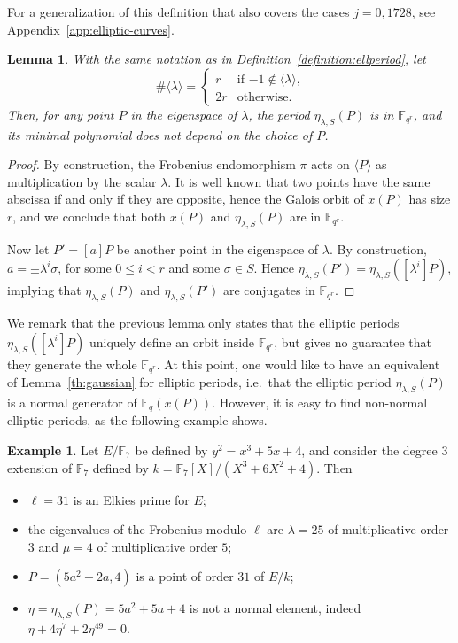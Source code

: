 \documentclass[12pt]{article}
\theoremstyle{plain}
\newtheorem{lemma}[theorem]{Lemma}
\theoremstyle{definition}
\newtheorem{example}[theorem]{Example}
\def\F{\ensuremath{\mathbb{F}}}
\begin{document}
For a generalization of this definition that also covers the cases
$j=0,1728$, see Appendix~\ref{app:elliptic-curves}.

\begin{lemma}
  \label{lemma:ellperiods-order}
  With the same notation as in Definition~\ref{definition:ellperiod},
  let
  \begin{equation*}
    \#\langle\lambda\rangle =
    \begin{cases}
      r & \text{if $-1\notin\langle\lambda\rangle$,}\\
      2r & \text{otherwise.}
    \end{cases}
  \end{equation*}
  Then, for any point $P$ in the eigenspace of $\lambda$, the period
  $\eta_{\lambda,S}(P)$ is in $\F_{q^r}$, and its minimal polynomial
  does not depend on the choice of $P$.
\end{lemma}
\begin{proof}
  By construction, the Frobenius endomorphism $\pi$ acts on
  $\langle P\rangle$ as multiplication by the scalar $\lambda$. It is
  well known that two points have the same abscissa if and only if
  they are opposite, hence the Galois orbit of $x(P)$ has size $r$,
  and we conclude that both $x(P)$ and $\eta_{\lambda,S}(P)$ are in
  $\F_{q^r}$.

  Now let $P'=[a]P$ be another point in the eigenspace of
  $\lambda$. By construction, $a=\pm \lambda^i\sigma$, for some
  $0\le i<r$ and some $\sigma\in S$. Hence
  $\eta_{\lambda,S}(P')=\eta_{\lambda,S}([\lambda^i]P)$, implying that
  $\eta_{\lambda,S}(P)$ and $\eta_{\lambda,S}(P')$ are conjugates in
  $\F_{q^r}$.
\end{proof}

We remark that the previous lemma only states that the elliptic
periods $\eta_{\lambda,S}([\lambda^i]P)$ uniquely define an orbit
inside $\F_{q^r}$, but gives no guarantee that they generate the whole
$\F_{q^r}$. %
At this point, one would like to have an equivalent of
Lemma~\ref{th:gaussian} for elliptic periods, i.e.\ that the elliptic
period $\eta_{\lambda,S}(P)$ is a normal generator of $\F_q(x(P))$.
However, it is easy to find non-normal elliptic periods, as the
following example shows.

\begin{example}
\label{ex:non-normal}
  Let $E/\F_7$ be defined by $y^2 = x^3 + 5 x + 4$, and consider the
  degree $3$ extension of $\F_7$ defined by
  $k=\F_7[X]/(X^3 + 6 X^2 + 4)$. Then
  \begin{itemize}
  \item $\ell = 31$ is an Elkies prime for $E$;
  \item the eigenvalues of the Frobenius modulo $\ell$ are
    $\lambda = 25$ of multiplicative order $3$ and $\mu = 4$ of
    multiplicative order $5$;
  \item $P = (5 a^2+2 a, 4)$ is a point of order $31$ of $E/k$;
  \item $\eta=\eta_{\lambda,S}(P) = 5 a^2 + 5 a + 4$ is not a normal
    element, indeed
    $\eta + 4 \eta^7 + 2 \eta^{49} = 0$.
  \end{itemize}
\end{example}
\end{document}
